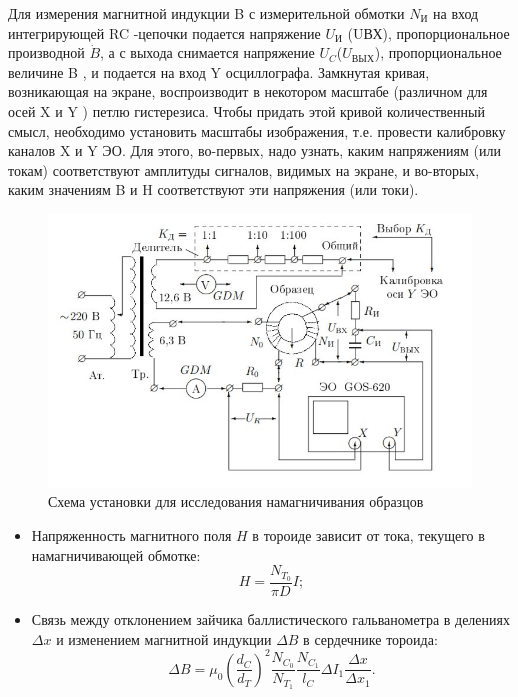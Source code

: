 \documentclass[a4paper,12pt]{article}
\begin{document}
Для измерения магнитной индукции B с измерительной обмотки $N_\text{И}$ на вход интегрирующей RC -цепочки подается напряжение $U_\text{И}$ (UВХ), пропорциональное производной $\dot{B}$, а с выхода снимается напряжение $U_{C}$($U_\text{ВЫХ}$), пропорциональное величине B , и подается на вход Y осциллографа.
Замкнутая кривая, возникающая на экране, воспроизводит в некотором масштабе (различном для осей X и Y ) петлю гистерезиса. Чтобы придать этой кривой количественный смысл, необходимо установить масштабы изображения, т.е. провести калибровку каналов X и Y ЭО. Для этого, во-первых, надо узнать, каким напряжениям (или токам) соответствуют амплитуды сигналов, видимых на экране, и во-вторых,  каким значениям B и H соответствуют эти напряжения
(или токи).

\begin{figure}[h!]
    \centering
    \includegraphics[width=\linewidth]{ust-3.jpg}
    \caption{Схема установки для исследования намагничивания образцов}
    \label{pic:caliber}
\end{figure}

\begin{itemize}
    \item
        Напряженность магнитного поля $H$ в тороиде зависит от тока, текущего в намагничивающей обмотке:
        \begin{equation}\label{eq:H}
            H = \frac{N_{T_0}}{\pi D} I;
        \end{equation}
    \item
        Связь между отклонением зайчика баллистического гальванометра в делениях $\Delta x$ и изменением магнитной индукции $\Delta B$ в сердечнике тороида:
        \begin{equation}\label{eq:B}
            \Delta B = \mu_0 \left(\frac{d_C}{d_T}\right)^2 \frac{N_{C_0}}{N_{T_1}} \frac{N_{C_1}}{l_C} \Delta I_1 \frac{\Delta x}{\Delta x_1}.
        \end{equation}
\end{itemize}
\end{document}

